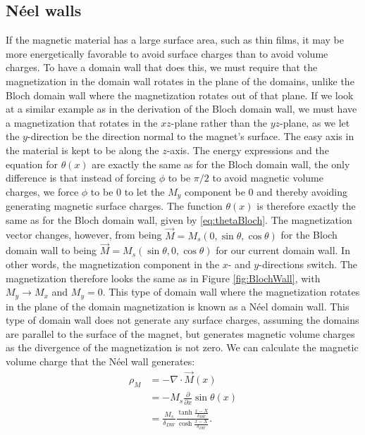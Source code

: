 \documentclass[12pt, a4paper, twoside, openright]{article}		%
\numberwithin{equation}{section}
\begin{document}
\subsection{N\'{e}el walls}
If the magnetic material has a large surface area, such as thin films, it may be more energetically favorable to avoid surface charges than to avoid volume charges. To have a domain wall that does this, we must require that the magnetization in the domain wall rotates in the plane of the domains, unlike the Bloch domain wall where the magnetization rotates out of that plane. If we look at a similar example as in the derivation of the Bloch domain wall, we must have a magnetization that rotates in the $xz$-plane rather than the $yz$-plane, as we let the $y$-direction be the direction normal to the magnet's surface. The easy axis in the material is kept to be along the $z$-axis. The energy expressions and the equation for $\theta (x)$ are exactly the same as for the Bloch domain wall, the only difference is that instead of forcing $\phi$ to be $\pi/2$ to avoid magnetic volume charges, we force $\phi$ to be 0 to let the $M_y$ component be 0 and thereby avoiding generating magnetic surface charges. The function $\theta(x)$ is therefore exactly the same as for the Bloch domain wall, given by \eqref{eq:thetaBloch}. The magnetization vector changes, however, from being $\vec{M} = M_s(0, \sin\theta, \cos\theta)$ for the Bloch domain wall to being $\vec{M} = M_s(\sin\theta, 0, \cos\theta)$ for our current domain wall. In other words, the magnetization component in the $x$- and $y$-directions switch. The magnetization therefore looks the same as in Figure \ref{fig:BlochWall}, with $M_y \rightarrow M_x$ and $M_y=0$. This type of domain wall where the magnetization rotates in the plane of the domain magnetization is known as a N\'{e}el domain wall. This type of domain wall does not generate any surface charges, assuming the domains are parallel to the surface of the magnet, but generates magnetic volume charges as the divergence of the magnetization is not zero. We can calculate the magnetic volume charge that the N\'{e}el wall generates:
\begin{align}
\nonumber\rho_M &= -\nabla\cdot\vec{M}(x) \\
\nonumber&= -M_s \frac{\partial}{\partial x} \sin \theta(x) \\
&= \frac{M_s}{\delta_{DW}}\frac{\tanh\frac{x-X}{\delta_{DW}}}{\cosh\frac{x-X}{\delta_{DW}}}.
\end{align}
\end{document}
